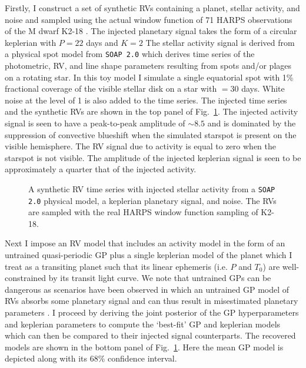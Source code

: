 Firstly, I construct
a set of synthetic RVs containing a planet, stellar activity, and noise and sampled using the
actual window function of 71 HARPS observations of the M dwarf K2-18 \citep{cloutier17b}.
The injected planetary
signal takes the form of a circular keplerian with $P=22$ days and $K=2$  The stellar
activity signal is derived from a physical spot model from \texttt{SOAP 2.0} \citep{dumusque14}
which derives time series of the photometric, RV, and line shape parameters resulting from
spots and/or plages on a rotating star. In this toy model I simulate a single equatorial spot
with 1\% fractional coverage of the visible stellar disk on a star with \prot{}$=30$ days.
White noise at the level of 1 \mps{} is also added to the time series.
The injected time series and the synthetic RVs are shown in the top panel of
Fig.~\ref{fig:RVsignals}. The injected activity signal is seen to have a peak-to-peak amplitude of
$\sim 8.5$ \mps{} and is dominated by the suppression of convective blueshift when the simulated
starspot is present on the visible hemisphere. The RV signal due to activity is equal to zero when
the starspot is not visible. The amplitude of the injected keplerian signal is seen to be
approximately a quarter that of the injected activity. \\

\begin{figure}
  \centering
  \caption[Synthetic RV time series used to demonstrate the effectiveness of GP activity modelling.]
          {A synthetic RV time series with injected stellar activity from a \texttt{SOAP 2.0} physical
            model, a keplerian planetary signal, and noise. The RVs are sampled with the real HARPS window
            function sampling of K2-18.}
  \label{fig:RVsignals}
\end{figure}

Next I impose an RV model that includes an activity model in the form of an untrained
quasi-periodic GP plus a single keplerian model of the planet which I treat as a transiting
planet such that its linear ephemeris (i.e. $P$ and $T_0$) are well-constrained by its transit
light curve. We note that untrained GPs can be dangerous as scenarios have been observed in which
an untrained GP model of RVs absorbs some planetary signal and can thus result in misestimated
planetary parameters \citep{ribas18}.
I proceed by deriving the joint posterior of the GP hyperparameters and keplerian
parameters to compute the `best-fit' GP and keplerian models which can then be compared to their
injected signal counterparts. The recovered models are shown in the bottom panel of
Fig.~\ref{fig:RVsignals}. Here the mean GP model is depicted along with its 68\% confidence
interval. \\

